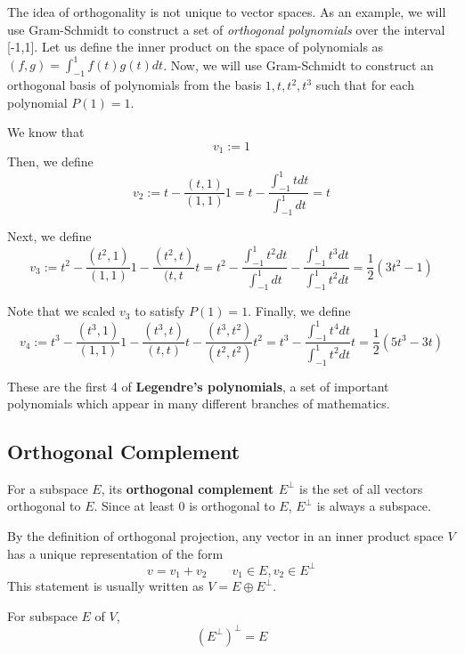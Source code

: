 The idea of orthogonality is not unique to vector spaces. As an example, we will use Gram-Schmidt to construct a set of \textit{orthogonal polynomials} over the interval [-1,1]. Let us define the inner product on the space of polynomials as $(f, g) = \int_{-1}^{1} f(t) g(t) dt$. Now, we will use Gram-Schmidt to construct an orthogonal basis of polynomials from the basis $1, t, t^{2}, t^{3}$ such that for each polynomial $P(1) = 1$.

We know that 
$$v_{1} := 1$$
Then, we define 
$$v_{2} := t - \frac{(t, 1)}{(1, 1)} 1 = t - \frac{\int_{-1}^{1} t dt}{\int_{-1}^{1} dt} = t
$$

Next, we define 
$$v_{3} := t^{2} - \frac{(t^{2}, 1)}{(1, 1)} 1 - \frac{(t^{2}, t)}{(t, t} t = t^{2} - \frac{\int_{-1}^{1} t^{2} dt}{\int_{-1}^{1} dt} - \frac{\int_{-1}^{1} t^{3} dt}{\int_{-1}^{1} t^{2} dt} = \frac{1}{2} (3t^{2} - 1)$$

Note that we scaled $v_{3}$ to satisfy $P(1) = 1$. Finally, we define 
$$v_{4} := t^{3} - \frac{(t^{3}, 1)}{(1, 1)} 1 - \frac{(t^{3}, t)}{(t, t)} t - \frac{(t^{3}, t^{2})}{(t^{2}, t^{2})} t^{2} = t^{3} - \frac{\int_{-1}^{1} t^{4} dt}{\int_{-1}^{1} t^{2} dt} t = \frac{1}{2} (5t^{3} - 3t)$$

These are the first 4 of \textbf{Legendre's polynomials}, a set of important polynomials which appear in many different branches of mathematics. 

\subsection{Orthogonal Complement}
\begin{definition}
For a subspace $E$, its \textbf{orthogonal complement $E^{\perp}$} is the set of all vectors orthogonal to $E$. Since at least 0 is orthogonal to $E$, $E^{\perp}$ is always a subspace. 
\end{definition}

By the definition of orthogonal projection, any vector in an inner product space $V$ has a unique representation of the form 
$$v = v_{1} + v_{2} \qquad v_{1} \in E, v_{2} \in E^{\perp}$$
This statement is usually written as $V = E \oplus E^{\perp}$.

\begin{theorem}
For subspace $E$ of $V$, 
$$(E^{\perp})^{\perp} = E$$
\end{theorem}

